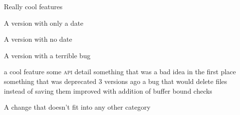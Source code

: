 \documentclass{article}
\begin{document}
\begin{changelog}[author=Rebecca Turner,
	sectioncmd=\subsection,
	title=Example changelog]
\begin{version}
	\added Really cool features
\end{version}

\begin{version}[date=2019-01-23]
	\item A version with only a date
\end{version}

\begin{version}[v=1.1.0]
	\item A version with no date
\end{version}

\begin{version}[v=1.0.1, yanked]
	\item A version with a terrible bug
\end{version}

\begin{version}[v=1.0.0, date=2018-10-26]
	\added a cool feature
	\changed some \textsc{api} detail
	\deprecated something that was a bad idea in the first place
	\removed something that was deprecated 3 versions ago
	\fixed a bug that would delete files instead of saving them
	\security improved with addition of buffer bound checks
	\item A change that doesn't fit into any other category
\end{version}
\end{changelog}
\end{document}
